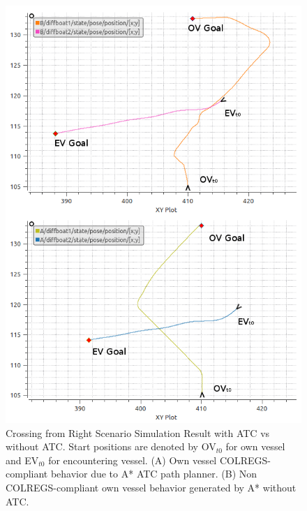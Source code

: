        \begin{figure}[H]
            \centering
            \includegraphics[scale=0.50]{figs/Result_CrossingRight_With_Without_ATC.png}
            \caption{Crossing from Right Scenario Simulation Result with \ac{ATC} vs without \ac{ATC}. Start positions are denoted by OV$_{t0}$ for own vessel and EV$_{t0}$ for encountering vessel. (A) Own vessel COLREGS-compliant behavior due to A* \ac{ATC} path planner. (B) Non COLREGS-compliant own vessel behavior generated by A* without \ac{ATC}.}
            \label{fig:Result_CrossingRight_With_Without_ATC}
        \end{figure}
        


